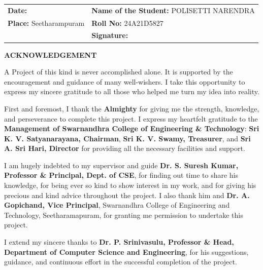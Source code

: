 \documentclass[12pt,a4paper,oneside]{report}
\begin{document}
\vspace{1.2in}
\noindent\begin{tabular}{@{}p{}p{}@{}}
    \textbf{Date:} & \textbf{Name of the Student:} POLISETTI NARENDRA \\ [0.15in]
    \textbf{Place:} Seetharampuram & \textbf{Roll No:} 24A21D5827 \\ [0.15in]
                   & \textbf{Signature:} \underline{\hspace{2.0in}}
\end{tabular}

\newpage
\thispagestyle{empty}
\begin{center}
    \vspace*{0.1in}
    {\fontsize{14}{16}\bfseries\selectfont ACKNOWLEDGEMENT\par}
\end{center}
\vspace{0.25in}

\begingroup
\setlength{\parskip}{4pt}

\noindent A Project of this kind is never accomplished alone. It is supported by the encouragement and guidance of many well-wishers. I take this opportunity to express my sincere gratitude to all those who helped me turn my idea into reality.

First and foremost, I thank the \textbf{Almighty} for giving me the strength, knowledge, and perseverance to complete this project. I express my heartfelt gratitude to the \textbf{Management of Swarnandhra College of Engineering \& Technology}: \textbf{Sri K. V. Satyanarayana, Chairman}, \textbf{Sri K. V. Swamy, Treasurer}, and \textbf{Sri A. Sri Hari, Director} for providing all the necessary facilities and support.

I am hugely indebted to my supervisor and guide \textbf{Dr. S. Suresh Kumar, Professor \& Principal, Dept. of CSE}, for finding out time to share his knowledge, for being ever so kind to show interest in my work, and for giving his precious and kind advice throughout the project. I also thank him and \textbf{Dr. A. Gopichand, Vice Principal}, Swarnandhra College of Engineering and Technology, Seetharamapuram, for granting me permission to undertake this project.

I extend my sincere thanks to \textbf{Dr. P. Srinivasulu, Professor \& Head, Department of Computer Science and Engineering}, for his suggestions, guidance, and continuous effort in the successful completion of the project.
\end{document}
